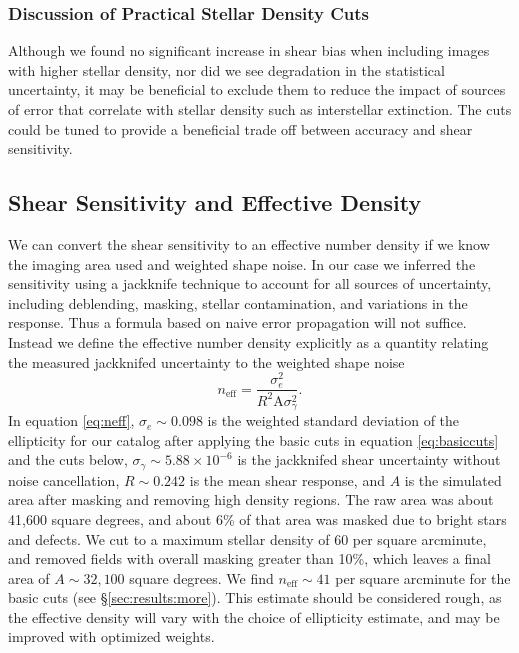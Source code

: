 \documentclass[twocolumn,twocolappendix,astrosym]{openjournal}
\begin{document}
\subsubsection{Discussion of Practical Stellar Density Cuts}

Although we found no significant increase in shear bias when including images
with higher stellar density, nor did we see degradation in the statistical
uncertainty, it may be beneficial to exclude them to reduce the impact of
sources of error that correlate with stellar density such as interstellar
extinction.  The cuts could be tuned to provide a beneficial trade off
between accuracy and shear sensitivity.

\subsection{Shear Sensitivity and Effective Density} \label{sec:results:effdens}


We can convert the shear sensitivity to an effective number density if we know
the imaging area used and weighted shape noise.  In our case we inferred the
sensitivity using a jackknife technique to account for all sources of
uncertainty, including deblending, masking, stellar contamination, and
variations in the response.  Thus a formula based on naive error propagation
will not suffice.  Instead we define the effective number density explicitly as
a quantity relating the measured jackknifed uncertainty to the weighted shape
noise
\begin{equation} \label{eq:neff}
    n_{\mathrm{eff}} = \frac{\sigma^2_{e}}{R^2 \mathrm{A} \sigma^2_{\gamma}}.
\end{equation}
In equation \ref{eq:neff}, $\sigma_e \sim 0.098$ is the weighted standard
deviation of the ellipticity for our catalog after applying the basic cuts in
equation \ref{eq:basiccuts} and the cuts below, $\sigma_\gamma \sim 5.88 \times
10^{-6}$ is the jackknifed shear uncertainty without noise cancellation, $R
\sim 0.242$ is the mean shear response, and $A$ is the simulated area after
masking and removing high density regions.    The raw area was about 41,600
square degrees, and about 6\% of that area was masked due to bright stars and
defects.  We cut to a maximum stellar density of 60 per square arcminute, and
removed fields with overall masking greater than 10\%, which leaves a final
area of $A \sim 32,100$ square degrees.  We find $n_\mathrm{eff} \sim 41$ per
square arcminute for the basic cuts (see \S \ref{sec:results:more}).  This
estimate should be considered rough, as the effective density will vary with
the choice of ellipticity estimate, and may be improved with optimized weights.
\end{document}
